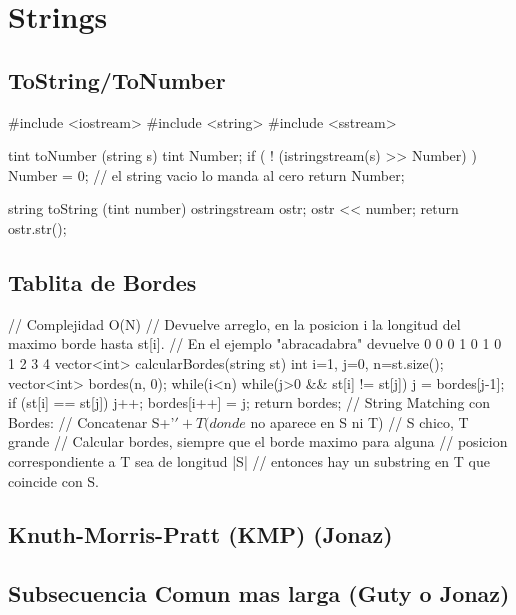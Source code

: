 \section{Strings}

\subsection{ToString/ToNumber}
\begin{code}
#include <iostream>
#include <string>
#include <sstream>

tint toNumber (string s)
{
	tint Number;
	if ( ! (istringstream(s) >> Number) )
		Number = 0; // el string vacio lo manda al cero
	return Number;
}

string toString (tint number)
{    
    ostringstream ostr;
    ostr << number;
    return  ostr.str();
}
\end{code}

\subsection{Tablita de Bordes}
\begin{code}
// Complejidad O(N)
// Devuelve arreglo, en la posicion i la longitud del maximo borde hasta st[i]. 
// En el ejemplo "abracadabra" devuelve 0 0 0 1 0 1 0 1 2 3 4 
vector<int> calcularBordes(string st) {
	int i=1, j=0, n=st.size();
	vector<int> bordes(n, 0);
	while(i<n) {
		while(j>0 && st[i] != st[j])
			j = bordes[j-1];
		if (st[i] == st[j])
			j++;
		bordes[i++] = j;
	}
	return bordes;
}
// String Matching con Bordes: 
// Concatenar S+'$'+T (donde $ no aparece en S ni T) 
// S chico, T grande
// Calcular bordes, siempre que el borde maximo para alguna 
// posicion correspondiente a T sea de longitud |S| 
// entonces hay un substring en T que coincide con S. 
\end{code}

\subsection{Knuth-Morris-Pratt (KMP) (Jonaz)}
\begin{code}
\end{code}

\subsection{Subsecuencia Comun mas larga (Guty o Jonaz)}
\begin{code}
\end{code}

